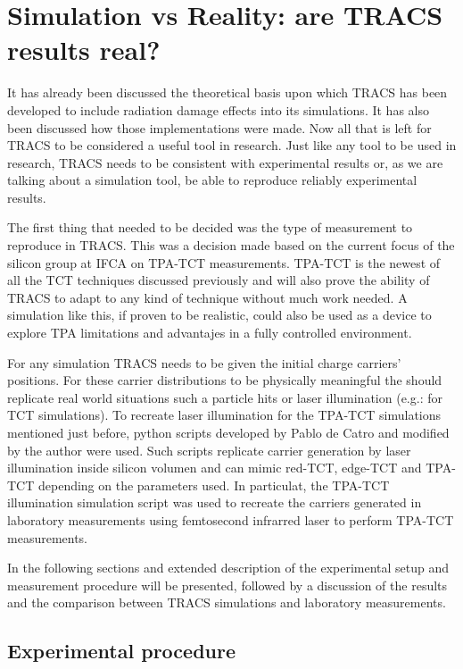 \chapter{Simulation vs Reality: are TRACS results real?}

It has already been discussed the theoretical basis upon which TRACS has been developed to include radiation damage effects into its simulations. It has also been discussed how those implementations were made. Now all that is left for TRACS to be considered a useful tool in research. Just like any tool to be used in research, TRACS needs to be consistent with experimental results or, as we are talking about a simulation tool, be able to reproduce reliably experimental results.

The first thing that needed to be decided was the type of measurement to reproduce in TRACS. This was a decision made based on the current focus of the silicon group at IFCA \iffalse No se el nombre oficial \fi on TPA-TCT measurements. TPA-TCT is the newest  of all the TCT techniques discussed previously and will also prove the ability of TRACS to adapt to any kind of technique without much work needed. A simulation like this, if proven to be realistic, could also be used as a device to explore TPA limitations and advantajes in a fully controlled environment.

For any simulation TRACS needs to be given the initial charge carriers' positions. For these carrier distributions to be physically meaningful the should replicate real world situations such a particle hits or laser illumination (e.g.: for TCT simulations). To recreate laser illumination for the TPA-TCT simulations mentioned just before, python scripts developed by Pablo de Catro and modified by the author were used. Such scripts replicate carrier generation by laser illumination inside silicon volumen and can mimic red-TCT, edge-TCT and TPA-TCT depending on the parameters used. In particulat, the TPA-TCT illumination simulation script was used to recreate the carriers generated in laboratory measurements using femtosecond infrarred laser to perform TPA-TCT measurements.

In the following sections and extended description of the experimental setup and  measurement procedure will be presented, followed by a discussion of the results and the comparison between TRACS simulations and laboratory measurements.

\section{Experimental procedure} %
\label{sec:future_improvements}

